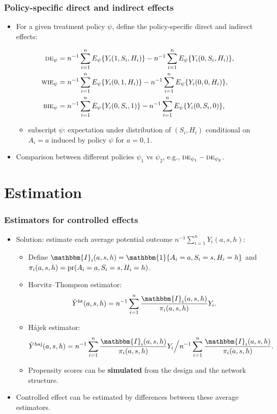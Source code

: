 \documentclass[aspectratio=169]{beamer}
\newcommand{\pr}{\textup{pr}}
\newcommand{\sumi}{\sum_{i=1}^n}
\newcommand{\de}{\textsc{de}}
\newcommand{\bie}{\textsc{bie}}
\newcommand{\wie}{\textsc{wie}}
\newcommand{\horthom}{\textup{ht}}
\newcommand{\haj}{\textup{haj}}
\newcommand{\indicator}{\mathbbm{1}}
\newcommand{\bbI}{\mathbbm{I}}
\newcommand{\pscore}[1]{\pi_{#1}}
\begin{document}
\begin{frame}
\frametitle{Policy-specific direct and indirect effects}
\begin{itemize}
    \item For a given treatment policy $\psi$, define the policy-specific direct and indirect effects:
    \begin{small}
    \begin{align*}
    \de_\psi &= n^{-1}\sumi E_\psi\{Y_i(1,S_i,H_i)\} - n^{-1}\sumi E_\psi\{Y_i(0,S_i,H_i)\}, \\
    \wie_\psi &= n^{-1}\sumi E_\psi\{Y_i(0,1,H_i)\} - n^{-1}\sumi E_\psi\{Y_i(0,0,H_i)\}, \\
    \bie_\psi &= n^{-1}\sumi E_\psi\{Y_i(0,S_i,1)\} - n^{-1}\sumi E_\psi\{Y_i(0,S_i,0)\},
    \end{align*}
    \end{small}
    \begin{itemize}
        \item subscript $\psi$: expectation under distribution of $(S_{i}, H_{i})$ conditional on $A_{i} = a$ induced by policy $\psi$ for $a=0,1$.
    \end{itemize}
    \item Comparison between different policies $\psi_1$ vs $\psi_2$, e.g., $\de_{\psi_1} - \de_{\psi_2}$.
\end{itemize}
\end{frame}

\section{Estimation}
\begin{frame}
\frametitle{Estimators for controlled effects}
\begin{itemize}
    \item Solution: estimate each average potential outcome $n^{-1}\sumi Y_i(a,s,h)$:
    \pause 
    \begin{itemize}
        \item Define $\bbI_{i}(a,s,h)=\indicator\{A_{i}=a,S_{i}=s,H_{i}=h\}$ and $\pscore{i}(a,s,h)=\pr(A_{i}=a, S_{i}=s, H_{i}=h)$.
        \pause 
        
        \item Horvitz--Thompson estimator: 
        $$\hat{Y}^{\horthom}(a,s,h) = n^{-1}\sumi\frac{\bbI_{i}(a,s,h)}{\pscore{i}(a,s,h)}Y_i.$$
        \pause 
        
        \item H\'{a}jek estimator:
        $$\hat{Y}^{\haj}(a,s,h) = n^{-1}\sumi\frac{\bbI_{i}(a,s,h)}{\pscore{i}(a,s,h)}Y_i \Big / n^{-1}\sumi\frac{\bbI_{i}(a,s,h)}{\pscore{i}(a,s,h)}.$$
        \pause 
        
        \item Propensity scores can be \textbf{simulated} from the design and the network structure. 
        \pause 
    \end{itemize}
    \item Controlled effect can be estimated by differences between these average estimators.
\end{itemize}
\end{frame}
\end{document}
